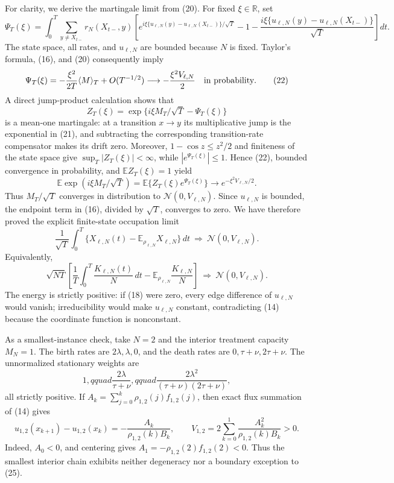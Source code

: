 For clarity, we derive the martingale limit from (20).  For fixed \(\xi\in\mathbb R\), set
\[
 \Psi_T(\xi)=\int_0^T\sum_{y\ne X_{t-}}r_N(X_{t-},y)
 \left[
 e^{i\xi\{u_{\ell,N}(y)-u_{\ell,N}(X_{t-})\}/\sqrt T}
 -1-\frac{i\xi\{u_{\ell,N}(y)-u_{\ell,N}(X_{t-})\}}{\sqrt T}
 \right]dt.
 \tag{21}
\]
The state space, all rates, and \(u_{\ell,N}\) are bounded because \(N\) is fixed.  Taylor's formula, (16), and (20) consequently imply
\[
 \Psi_T(\xi)
 =-\frac{\xi^2}{2T}\langle M\rangle_T+O(T^{-1/2})
 \longrightarrow-\frac{\xi^2V_{\ell,N}}2
 \quad\hbox{in probability}.
 \tag{22}
\]
A direct jump-product calculation shows that
\[
 Z_T(\xi)=\exp\{i\xi M_T/\sqrt T-\Psi_T(\xi)\}
 \tag{23}
\]
is a mean-one martingale: at a transition \(x\to y\) its multiplicative jump is the exponential in (21), and subtracting the corresponding transition-rate compensator makes its drift zero.  Moreover, \(1-\cos z\leq z^2/2\) and finiteness of the state space give \(\sup_T|Z_T(\xi)|<\infty\), while \(|e^{\Psi_T(\xi)}|\leq1\).  Hence (22), bounded convergence in probability, and \(\mathbb E Z_T(\xi)=1\) yield
\[
 \mathbb E\exp(i\xi M_T/\sqrt T)
 =\mathbb E\{Z_T(\xi)e^{\Psi_T(\xi)}\}
 \longrightarrow e^{-\xi^2V_{\ell,N}/2}.
 \tag{24}
\]
Thus \(M_T/\sqrt T\) converges in distribution to \(\mathcal N(0,V_{\ell,N})\).  Since \(u_{\ell,N}\) is bounded, the endpoint term in (16), divided by \(\sqrt T\), converges to zero.  We have therefore proved the explicit finite-state occupation limit
\[
 \frac1{\sqrt T}\int_0^T
 \{X_{\ell,N}(t)-\mathbb E_{\rho_{\ell,N}}X_{\ell,N}\}\,dt
 \ \Longrightarrow\ \mathcal N(0,V_{\ell,N}).
 \tag{25}
\]
Equivalently,
\[
 \sqrt{NT}\left[
 \frac1T\int_0^T\frac{K_{\ell,N}(t)}N\,dt
 -\mathbb E_{\rho_{\ell,N}}\frac{K_{\ell,N}}N
 \right]
 \ \Longrightarrow\ \mathcal N(0,V_{\ell,N}).
 \tag{26}
\]
The energy is strictly positive: if (18) were zero, every edge difference of \(u_{\ell,N}\) would vanish; irreducibility would make \(u_{\ell,N}\) constant, contradicting (14) because the coordinate function is nonconstant.

As a smallest-instance check, take \(N=2\) and the interior treatment capacity \(M_N=1\).  The birth rates are \(2\lambda,\lambda,0\), and the death rates are \(0,\tau+\nu,2\tau+\nu\).  The unnormalized stationary weights are
\[
 1,qquad \frac{2\lambda}{\tau+\nu},qquad
 \frac{2\lambda^2}{(\tau+\nu)(2\tau+\nu)},
 \tag{27}
\]
all strictly positive.  If \(A_k=\sum_{j=0}^k\rho_{1,2}(j)f_{1,2}(j)\), then exact flux summation of (14) gives
\[
 u_{1,2}(x_{k+1})-u_{1,2}(x_k)
 =-\frac{A_k}{\rho_{1,2}(k)B_k},
 \qquad
 V_{1,2}=2\sum_{k=0}^1\frac{A_k^2}{\rho_{1,2}(k)B_k}>0.
 \tag{28}
\]
Indeed, \(A_0<0\), and centering gives \(A_1=-\rho_{1,2}(2)f_{1,2}(2)<0\).  Thus the smallest interior chain exhibits neither degeneracy nor a boundary exception to (25).


